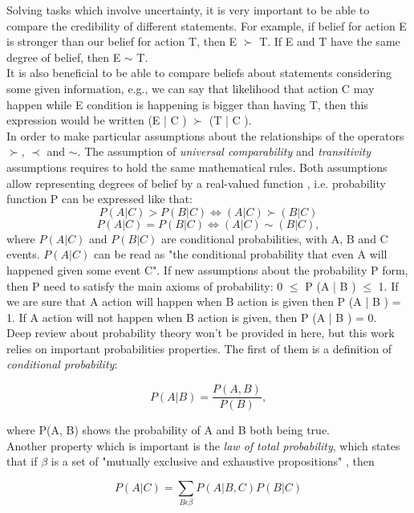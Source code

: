 Solving tasks which involve uncertainty, it is very important to be able to compare the credibility of different statements. For example, if belief for action E is stronger than our belief for action T, then E $\succ$ T. If E and T have the same degree of belief, then E $\sim$ T. \\
It is also beneficial to be able to compare beliefs about statements considering some given information, e.g., we can say that likelihood that action C may happen while E condition is happening is bigger than having T, then this expression would be written (E | C ) $\succ$ (T | C ). \\
In order to make particular assumptions about the relationships of the operators $\succ$, $\prec$ and $\sim$. The assumption of \textit{universal comparability} and \textit{transitivity} assumptions requires to hold the same mathematical rules. Both assumptions allow representing degrees of belief by a real-valued function \cite{BOOK}, i.e. probability function P can be expressed like that:
\[ P(A|C) > P(B|C) \iff (A|C) \succ (B|C) \]
\[P(A|C) = P(B|C) \iff (A|C) \sim (B|C), \]
where $P(A|C)$ and $P(B|C)$ are conditional probabilities, with A, B and C events. $P(A|C)$ can be read as "the conditional probability that even A will happened given some event C". If new assumptions about the probability P form, then P need to satisfy the main axioms of probability: 0 $\leqslant$ P (A | B ) $\leqslant$ 1. If we are sure that A action will happen when B action is given then P (A | B ) = 1. If A action will not happen when B action is given, then
P (A | B ) = 0. \\
Deep review about probability theory won't be provided in here, but this work relies on important probabilities properties. The first of them is a definition of \textit{conditional probability}:

\begin{equation}
P(A|B)=\frac{P(A,B)}{P(B)},
\end{equation}

where P(A, B) shows the probability of A and B both being true. \\
Another property which is important is the \textit{law of total probability}, which states that if $\beta$ is a set of "mutually exclusive and exhaustive propositions" \cite{BOOK}, then

\begin{equation}
P(A|C)=\displaystyle \sum_{B \epsilon \beta}{P(A|B,C)P(B|C)}
\end{equation}

